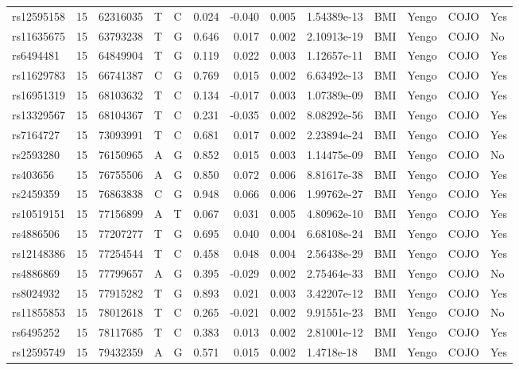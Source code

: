 \documentclass[11pt,twoside]{bristolthesis}
\begin{document}
\begin{longtable}[t]{lrlllrrrlllll}
rs12595158 & 15 & 62316035 & T & C & 0.024 & -0.040 & 0.005 & 1.54389e-13 & BMI & Yengo & COJO & Yes\\
\addlinespace
rs11635675 & 15 & 63793238 & T & G & 0.646 & 0.017 & 0.002 & 2.10913e-19 & BMI & Yengo & COJO & No\\
rs6494481 & 15 & 64849904 & T & G & 0.119 & 0.022 & 0.003 & 1.12657e-11 & BMI & Yengo & COJO & Yes\\
rs11629783 & 15 & 66741387 & C & G & 0.769 & 0.015 & 0.002 & 6.63492e-13 & BMI & Yengo & COJO & Yes\\
rs16951319 & 15 & 68103632 & T & C & 0.134 & -0.017 & 0.003 & 1.07389e-09 & BMI & Yengo & COJO & Yes\\
rs13329567 & 15 & 68104367 & T & C & 0.231 & -0.035 & 0.002 & 8.08292e-56 & BMI & Yengo & COJO & Yes\\
\addlinespace
rs7164727 & 15 & 73093991 & T & C & 0.681 & 0.017 & 0.002 & 2.23894e-24 & BMI & Yengo & COJO & Yes\\
rs2593280 & 15 & 76150965 & A & G & 0.852 & 0.015 & 0.003 & 1.14475e-09 & BMI & Yengo & COJO & No\\
rs403656 & 15 & 76755506 & A & G & 0.850 & 0.072 & 0.006 & 8.81617e-38 & BMI & Yengo & COJO & Yes\\
rs2459359 & 15 & 76863838 & C & G & 0.948 & 0.066 & 0.006 & 1.99762e-27 & BMI & Yengo & COJO & Yes\\
rs10519151 & 15 & 77156899 & A & T & 0.067 & 0.031 & 0.005 & 4.80962e-10 & BMI & Yengo & COJO & Yes\\
\addlinespace
rs4886506 & 15 & 77207277 & T & G & 0.695 & 0.040 & 0.004 & 6.68108e-24 & BMI & Yengo & COJO & Yes\\
rs12148386 & 15 & 77254544 & T & C & 0.458 & 0.048 & 0.004 & 2.56438e-29 & BMI & Yengo & COJO & Yes\\
rs4886869 & 15 & 77799657 & A & G & 0.395 & -0.029 & 0.002 & 2.75464e-33 & BMI & Yengo & COJO & No\\
rs8024932 & 15 & 77915282 & T & G & 0.893 & 0.021 & 0.003 & 3.42207e-12 & BMI & Yengo & COJO & Yes\\
rs11855853 & 15 & 78012618 & T & C & 0.265 & -0.021 & 0.002 & 9.91551e-23 & BMI & Yengo & COJO & No\\
\addlinespace
rs6495252 & 15 & 78117685 & T & C & 0.383 & 0.013 & 0.002 & 2.81001e-12 & BMI & Yengo & COJO & Yes\\
rs12595749 & 15 & 79432359 & A & G & 0.571 & 0.015 & 0.002 & 1.4718e-18 & BMI & Yengo & COJO & Yes\\

\end{longtable}
\end{document}
